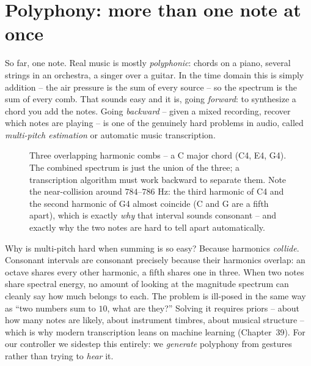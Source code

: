 \section{Polyphony: more than one note at once}
\label{ch29:polyphony}

So far, one note. Real music is mostly \emph{polyphonic}: chords on a piano, several strings in an
orchestra, a singer over a guitar. In the time domain this is simply addition -- the air pressure is
the sum of every source -- so the spectrum is the sum of every comb. That sounds easy and it is, going
\emph{forward}: to synthesize a chord you add the notes. Going \emph{backward} -- given a mixed
recording, recover which notes are playing -- is one of the genuinely hard problems in audio, called
\emph{multi-pitch estimation} or automatic music transcription.

\begin{figure}[H]
\centering
{}
\caption{Three overlapping harmonic combs -- a C major chord (C4, E4, G4). The combined spectrum is
just the union of the three; a transcription algorithm must work backward to separate them. Note the
near-collision around $784$--$786$ Hz: the third harmonic of C4 and the second harmonic of G4 almost
coincide (C and G are a fifth apart), which is exactly \emph{why} that interval sounds consonant -- and
exactly why the two notes are hard to tell apart automatically.}
\label{ch29:fig-chord}
\end{figure}

\begin{whybox}
Why is multi-pitch hard when summing is so easy? Because harmonics \emph{collide}. Consonant
intervals are consonant precisely because their harmonics overlap: an octave shares every other
harmonic, a fifth shares one in three. When two notes share spectral energy, no amount of looking at
the magnitude spectrum can cleanly say how much belongs to each. The problem is ill-posed in the same
way as ``two numbers sum to $10$, what are they?'' Solving it requires priors -- about how many notes
are likely, about instrument timbres, about musical structure -- which is why modern transcription
leans on machine learning (Chapter~39). For our controller we sidestep this entirely: we
\emph{generate} polyphony from gestures rather than trying to \emph{hear} it.
\end{whybox}

